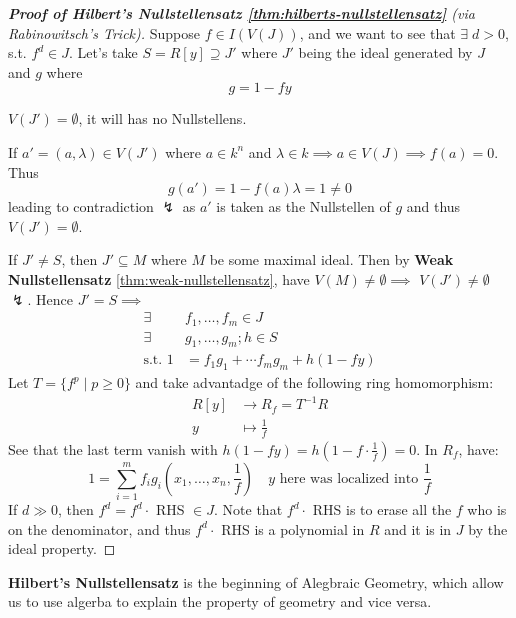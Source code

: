 \begin{proof}[\textbf{Proof of Hilbert's Nullstellensatz
			\ref{thm:hilberts-nullstellensatz}} (via
		Rabinowitsch's Trick)]
	Suppose \( f \in I(V(J)) \), and we want to see that \( \exists \; d > 0 \), s.t. \( f^d \in J \).
	Let's take \( S = R[y] \supseteq J' \) where \( J' \) being the ideal generated by \( J \) and \( g \) where
	\[
		g = 1 - fy
	\]
	\begin{claim}
		\( V(J') = \emptyset \), it will has no Nullstellens.
	\end{claim}
	If \( a' = (a,\lambda) \in V(J') \) where \( a \in k^n \) and \( \lambda\in k \implies a \in V(J)
	\implies f(a) = 0\). Thus
	\[
		g(a') = 1 - f(a) \lambda = 1 \ne 0
	\]
	leading to contradiction \( \lightning \) as \( a' \) is taken as the Nullstellen of \( g \) and thus \( V(J') =
	\emptyset \).

	If \( J' \ne S \), then \( J' \subseteq M \) where \( M \) be some maximal ideal. Then by
	\textbf{Weak Nullstellensatz}
	\ref{thm:weak-nullstellensatz}, have \( V(M) \ne
	\emptyset \implies\) \( V(J')\ne \emptyset \) \( \lightning \). Hence \( J' = S \implies \)
	\[
		\begin{aligned}
			\exists \;     & f_1,\ldots, f_m \in J               \\
			\exists \;     & g_1,\ldots, g_m; h \in S            \\
			\text{s.t. } 1 & = f_1g_1 + \cdots f_m g_m + h(1-fy)
		\end{aligned}
	\]
	Let \( T = \{f^p \; | \; p \geq 0\} \) and take advantadge of the following ring homomorphism:
	\[
		\begin{aligned}
			R[y] & \to R_f = T^{-1} R  \\
			y    & \mapsto \frac{1}{f}
		\end{aligned}
	\]
	See that the last term vanish with \( h(1-fy) = h(1-f\cdot \frac{1}{f}) = 0 \). In \( R_f \), have:
	\[
		1 = \sum_{i=1}^m f_i g_i (x_1,\ldots, x_n, \frac{1}{f}) \quad \text{$y$ here was localized into
			$\frac{1}{f}$}
	\]
	If \( d \gg 0 \), then \( f^d = f^d \cdot \) RHS \( \in J \). Note that \( f^d \cdot \) RHS is to
	erase all the \( f \) who is on the denominator, and thus \( f^d \cdot \) RHS is a polynomial in
	\( R \) and it is in \( J \) by the ideal property.
\end{proof}
\textbf{Hilbert's Nullstellensatz} is the beginning of Alegbraic Geometry, which allow us to use
algerba to explain the property of geometry and vice versa.

